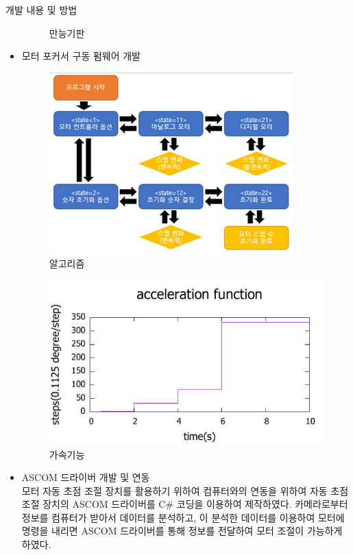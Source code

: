 \documentclass{gshs_poster_beamer}
\begin{document}
\begin{columns}[T]
\begin{posterbox}[colbacktitle=blue!50!black,coltitle=white,colback=cyan!5]{개발 내용 및 방법}
\begin{itemize}
\begin{figure}[h]
		\caption{만능기판}
		\label{fig:circuit1}
	\end{figure}
	\item 모터 포커서 구동 펌웨어 개발\\
	\begin{figure}[h]
		\centering
		\includegraphics[scale=0.8]{algorithm}
		\caption{알고리즘}
		\label{fig:algorithm}
	\end{figure}
	\begin{figure}[h]
		\centering
		\includegraphics[scale=0.5]{function}
		\caption{가속기능}
		\label{fig:function}
	\end{figure}
	\item ASCOM 드라이버 개발 및 연동\\
	모터 자동 초점 조절 장치를 활용하기 위하여 컴퓨터와의 연동을 위하여 자동 초점 조절 장치의 ASCOM 드라이버를 C\# 코딩을 이용하여 제작하였다. 카메라로부터 정보를 컴퓨터가 받아서 데이터를 분석하고, 이 분석한 데이터를 이용하여 모터에 명령을 내리면 ASCOM 드라이버를 통해 정보를 전달하여 모터 조절이 가능하게 하였다.
  \end{itemize}
\end{posterbox}


\end{columns}
\end{document}

